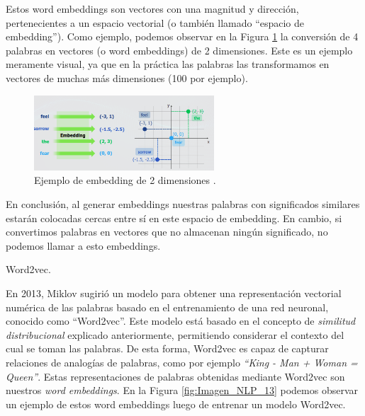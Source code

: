\documentclass[12pt,a4paper]{article}
\makeatletter
\renewcommand\paragraph{\@startsection{paragraph}{4}{\z@}
            {-2.5ex\@plus -1ex \@minus -.25ex}
            {1.25ex \@plus .25ex}
            {\normalfont\normalsize\bfseries}}
\makeatother
\begin{document}
\begin{sloppypar}
Estos word embeddings son vectores con una magnitud y dirección, pertenecientes a un espacio vectorial (o también llamado “espacio de embedding”). Como ejemplo, podemos observar en la Figura \ref{fig:Imagen_NLP_12} la conversión de 4 palabras en vectores (o word embeddings) de 2 dimensiones. Este es un ejemplo meramente visual, ya que en la práctica las palabras las transformamos en vectores de muchas más dimensiones (100 por ejemplo). 

\begin{figure}[H]    
 \centering
 \includegraphics[width=0.6\textwidth]{images/NLP/12.png}
 \caption{ Ejemplo de embedding de 2 dimensiones \cite{NLP_28}.}
 \label{fig:Imagen_NLP_12}
\end{figure}

En conclusión, al generar embeddings nuestras palabras con significados similares estarán colocadas cercas entre sí en este espacio de embedding. En cambio, si convertimos palabras en vectores que no almacenan ningún significado, no podemos llamar a esto embeddings. 

\cleardoublepage

\paragraph{Word2vec.}\label{word2vec}

En 2013, Miklov\cite{NLP_11} sugirió un modelo para obtener una representación vectorial numérica de las palabras basado en el entrenamiento de una red neuronal, conocido como “Word2vec”. Este modelo está basado en el concepto de \textit{similitud distribucional} explicado anteriormente, permitiendo considerar el contexto del cual se toman las palabras. De esta forma, Word2vec es capaz de capturar relaciones de analogías de palabras, como por ejemplo \textit{“King - Man + Woman = Queen”}.  Estas representaciones de palabras obtenidas mediante Word2vec son nuestros \textit{word embeddings}. En la Figura \ref{fig:Imagen_NLP_13} podemos observar un ejemplo de estos word embeddings luego de entrenar un modelo Word2vec.


\end{sloppypar}
\end{document}
